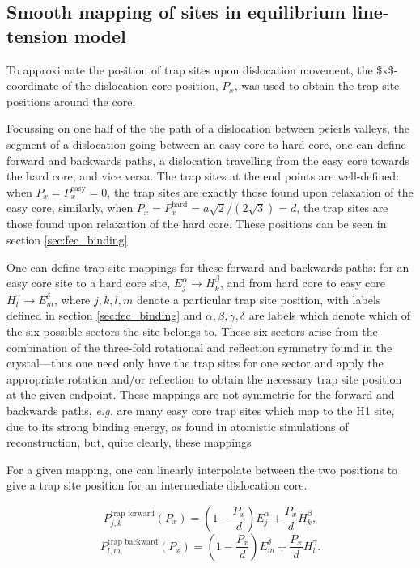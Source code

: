 \documentclass[a4paper,11pt]{article}
\begin{document}
\subsection{Smooth mapping of sites in equilibrium line-tension model}
\label{sec:orga3e02d3}
\label{sec:smoothsitemapping}

To approximate the position of trap sites upon dislocation movement, the
\$x\$-coordinate of the dislocation core position, \(P_x\), was used to obtain the trap
site positions around the core.

Focussing on one half of the the path of a dislocation between peierls
valleys, the segment of a dislocation going between an easy core to hard
core, one can define forward and backwards paths, a dislocation travelling
from the easy core towards the hard core, and vice versa. The trap sites at
the end points are well-defined: when \(P_x = P_x^{\text{easy}} = 0\), the trap
sites are exactly those found upon relaxation of the easy core, similarly,
when \(P_x = P_x^{\text{hard}} = a\sqrt{2} / (2\sqrt{3}) = d\), the trap sites are
those found upon relaxation of the hard core. These positions can be seen in
section \ref{sec:fec_binding}.

One can define trap site mappings for these forward and backwards paths: for an easy
core site to a hard core site, \(E_j^{\alpha} \rightarrow H_k^{\beta}\), and
from hard core to easy core \(H_l^{\gamma} \rightarrow E_m^{\delta}\), where
\(j,k,l,m\) denote a particular trap site position, with labels defined in section \ref{sec:fec_binding} and
\(\alpha,\beta,\gamma,\delta\) are labels which denote which of the six possible sectors the
site belongs to. These six sectors arise from the combination of the
three-fold rotational and reflection symmetry found in the crystal---thus one
need only have the trap sites for one sector and apply the appropriate rotation and/or
reflection to obtain the necessary trap site position at the given endpoint. These mappings are not
symmetric for the forward and backwards paths, \emph{e.g.} are many easy core trap
sites which map to the H1 site, due to its strong binding energy, as found in
atomistic simulations of reconstruction, but, quite clearly, these mappings


For a given mapping, one can linearly interpolate between the two positions to give a trap site position for an
intermediate dislocation core.

\[ P^{\text{trap forward}}_{j,k}(P_x) =  \left( 1-\frac{P_x}{d} \right) E_j^{\alpha} +   \frac{P_x}{d}H_k^{\beta},\]
\[ P^{\text{trap backward}}_{l,m}(P_x) =  \left( 1-\frac{P_x}{d} \right) E_m ^{\delta} + \frac{P_x}{d}H_l^{\gamma}.\]
\end{document}
